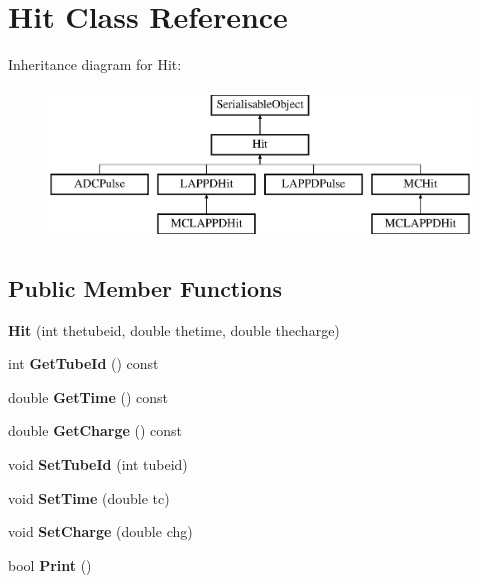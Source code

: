 \hypertarget{classHit}{\section{Hit Class Reference}
\label{classHit}
}
Inheritance diagram for Hit\-:\begin{figure}[H]
\begin{center}
\leavevmode
\includegraphics[height=4.000000cm]{classHit}
\end{center}
\end{figure}
\subsection*{Public Member Functions}
\begin{DoxyCompactItemize}
\item 
\hypertarget{classHit_a46c21425b896c5638598b4116de73740}{{\bfseries Hit} (int thetubeid, double thetime, double thecharge)}\label{classHit_a46c21425b896c5638598b4116de73740}

\item 
\hypertarget{classHit_ad4da9c11c8a203b65bd8b97b144a8133}{int {\bfseries Get\-Tube\-Id} () const }\label{classHit_ad4da9c11c8a203b65bd8b97b144a8133}

\item 
\hypertarget{classHit_aa67ab762ecf9eab3d41147667447c597}{double {\bfseries Get\-Time} () const }\label{classHit_aa67ab762ecf9eab3d41147667447c597}

\item 
\hypertarget{classHit_a77e2a2c8ed9449b38fc00e1d516d122a}{double {\bfseries Get\-Charge} () const }\label{classHit_a77e2a2c8ed9449b38fc00e1d516d122a}

\item 
\hypertarget{classHit_a2f1d81f94c9cfc35ba664b94fd719156}{void {\bfseries Set\-Tube\-Id} (int tubeid)}\label{classHit_a2f1d81f94c9cfc35ba664b94fd719156}

\item 
\hypertarget{classHit_af540ccdede0608cdd9ce6e754258b5e8}{void {\bfseries Set\-Time} (double tc)}\label{classHit_af540ccdede0608cdd9ce6e754258b5e8}

\item 
\hypertarget{classHit_aabbc33179a273289414263478835f2b9}{void {\bfseries Set\-Charge} (double chg)}\label{classHit_aabbc33179a273289414263478835f2b9}

\item 
\hypertarget{classHit_acebd1b0fb425a531faefed955f4c87e2}{bool {\bfseries Print} ()}\label{classHit_acebd1b0fb425a531faefed955f4c87e2}

\end{DoxyCompactItemize}
